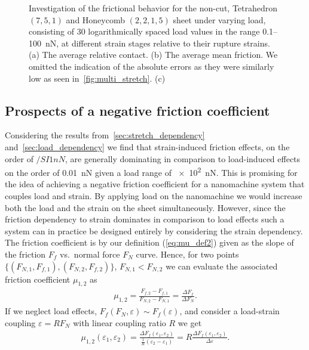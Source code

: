 \begin{figure}[H]
\begin{subfigure}[t]{0.8\textwidth}
      \caption{}
     \label{fig:multi_FN_fric_vs_contact}
  \end{subfigure}
  \hfill
     \caption{Investigation of the frictional behavior for the non-cut, Tetrahedron $(7,5,1)$ and Honeycomb $(2,2,1,5)$ sheet under varying load, consisting of 30 logarithmically spaced load values in the range 0.1--\SI{100}{nN}, at different strain stages relative to their rupture strains. (a) The average relative contact. (b) The average mean friction. We omitted the indication of the absolute errors as they were similarly low as seen in~\cref{fig:multi_stretch}. (c)}
     \label{fig:multi_load}
\end{figure}

\subsection{Prospects of a negative friction coefficient}\label{sec:neg_prospects}
Considering the results from~\cref{sec:stretch_dependency} and~\cref{sec:load_dependency} we find that strain-induced friction effects, on the order of $/SI{1}{nN}$, are generally dominating in comparison to load-induced effects on the order of \SI{0.01}{nN} given a load range of \SI{e2}{nN}. This is promising for the idea of achieving a negative friction coefficient for a nanomachine system that couples load and strain. By applying load on the nanomachine we would increase both the load and the strain on the sheet simultaneously. However, since the friction dependency to strain dominates in comparison to load effects such a system can in practice be designed entirely by considering the strain dependency. The friction coefficient is by our definition (\cref{eq:mu_def2}) given as the slope of the friction $F_f$ vs.\ normal force $F_N$ curve. Hence, for two points $\{(F_{N,1}, F_{f,1}), (F_{N,2}, F_{f,2})\}$, $F_{N,1} < F_{N,2}$ we can evaluate the associated friction coefficient $\mu_{1,2}$ as 
\begin{align*}
  \mu_{1,2} = \frac{F_{f,2} - F_{f,1}}{F_{N,2} - F_{N,1}} = \frac{\Delta F_f}{\Delta F_N}.
\end{align*}
If we neglect load effects, $F_f(F_N, \varepsilon) \sim F_f(\varepsilon)$, and consider a load-strain coupling $\varepsilon = R F_N$ with linear coupling ratio $R$ we get 
\begin{align}
  \mu_{1,2}(\varepsilon_1, \varepsilon_2) = \frac{\Delta F_{f}(\varepsilon_1, \varepsilon_2)}{\frac{1}{R}(\varepsilon_2 - \varepsilon_1)} = R\frac{\Delta F_{f}(\varepsilon_1, \varepsilon_2)}{\Delta \varepsilon}.
  \label{eq:mu_strain}
\end{align}
